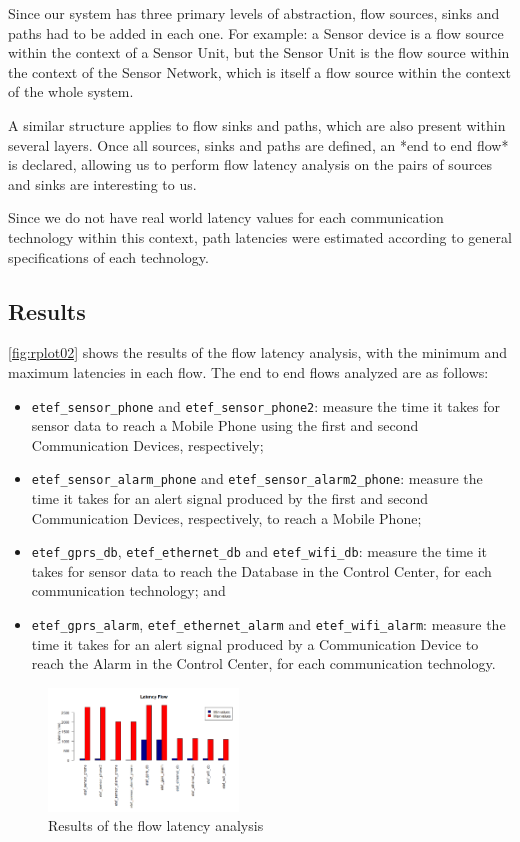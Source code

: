 Since our system has three primary levels of abstraction, flow sources, sinks and paths had to be added in each one. For example: a Sensor device is a flow source within the context of a Sensor Unit, but the Sensor Unit is the flow source within the context of the Sensor Network, which is itself a flow source within the context of the whole system.

A similar structure applies to flow sinks and paths, which are also present within several layers. Once all sources, sinks and paths are defined, an *end to end flow* is declared, allowing us to perform flow latency analysis on the pairs of sources and sinks are interesting to us.

Since we do not have real world latency values for each communication technology within this context, path latencies were estimated according to general specifications of each technology.

\subsection{Results}

\autoref{fig:rplot02} shows the results of the flow latency analysis, with the minimum and maximum latencies in each flow. The end to end flows analyzed are as follows:

\begin{itemize}
	\item \texttt{etef\_sensor\_phone} and \texttt{etef\_sensor\_phone2}: measure the time it takes for sensor data to reach a Mobile Phone using the first and second Communication Devices, respectively;
	\item \texttt{etef\_sensor\_alarm\_phone} and \texttt{etef\_sensor\_alarm2\_phone}: measure the time it takes for an alert signal produced by the first and second Communication Devices, respectively, to reach a Mobile Phone;
	\item \texttt{etef\_gprs\_db}, \texttt{etef\_ethernet\_db} and \texttt{etef\_wifi\_db}: measure the time it takes for sensor data to reach the Database in the Control Center, for each communication technology; and
	\item \texttt{etef\_gprs\_alarm}, \texttt{etef\_ethernet\_alarm} and \texttt{etef\_wifi\_alarm}: measure the time it takes for an alert signal produced by a Communication Device to reach the Alarm in the Control Center, for each communication technology.
\end{itemize}

\begin{figure}[h]
\caption{Results of the flow latency analysis}
\label{fig:rplot02}
\centering
\includegraphics[width=0.45\textwidth]{Rplot02}
\end{figure}

